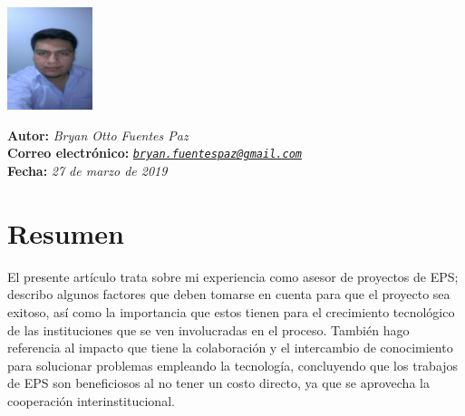 \documentclass[11pt,spanish,Letterpaper,openany]{book}
\begin{document}
\begin {flushleft}

\begin{tcolorbox}[sharp corners=uphill, colback=fondo, colframe=fondo, arc=6mm, boxrule=0mm, boxsep=2mm,  opacityframe=0.19,  opacityback=0.19]

\begin{minipage}[c]{3cm}

\includegraphics[width=2.5cm,height=\textheight]{images/201901-bfuentes-photo.jpg}

\end{minipage}\begin{minipage}[c]{12cm}

\textbf{Autor:} \emph{Bryan Otto Fuentes Paz}\\
\textbf{Correo electrónico:} \emph{\href{mailto:bryan.fuentespaz@gmail.com}{\nolinkurl{bryan.fuentespaz@gmail.com}}}\\
\textbf{Fecha:} \emph{27 de marzo de 2019}

\end{minipage}

\end {tcolorbox}

\end {flushleft}

\hypertarget{resumen}{%
\section*{Resumen}\label{resumen}}

El presente artículo trata sobre mi experiencia como asesor de proyectos de EPS; describo algunos factores que deben tomarse en cuenta para que el proyecto sea exitoso, así como la importancia que estos tienen para el crecimiento tecnológico de las instituciones que se ven involucradas en el proceso. También hago referencia al impacto que tiene la colaboración y el intercambio de conocimiento para solucionar problemas empleando la tecnología, concluyendo que los trabajos de EPS son beneficiosos al no tener un costo directo, ya que se aprovecha la cooperación interinstitucional.
\end{document}
